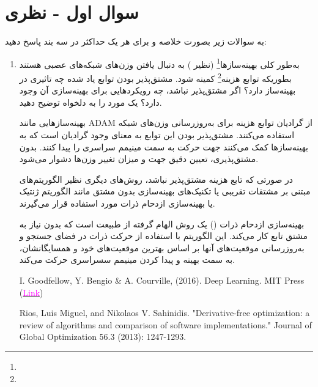 \section{سوال اول - نظری}
به سوالات زیر بصورت خلاصه و برای هر یک حداکثر در سه بند پاسخ دهید:

\begin{enumerate}
	\item 
به‌طور کلی بهینه‌سازها\footnote{} (نظیر ) به دنبال یافتن وزن‌های شبکه‌های عصبی هستند بطوریکه توابع هزینه\footnote{} کمینه شود. مشتق‌پذیر بودن توابع یاد شده چه تاثیری در بهینه‌ساز دارد؟ اگر مشتق‌پذیر نباشد، چه رویکردهایی برای بهینه‌سازی آن وجود دارد؟ یک مورد را به دلخواه توضیح دهید.
\begin{qsolve}
بهینه‌سازهایی مانند ADAM از گرادیان‌ توابع هزینه برای به‌روزرسانی وزن‌های شبکه استفاده می‌کنند. مشتق‌پذیر بودن این توابع به معنای وجود گرادیان‌ است که به بهینه‌سازها کمک می‌کنند جهت حرکت به سمت مینیمم سراسری را پیدا کنند. بدون مشتق‌پذیری، تعیین دقیق جهت و میزان تغییر وزن‌ها دشوار می‌شود.
		
در صورتی که تابع هزینه مشتق‌پذیر نباشد، روش‌های دیگری نظیر الگوریتم‌های مبتنی بر مشتقات تقریبی یا تکنیک‌های بهینه‌سازی بدون مشتق مانند الگوریتم‌ ژنتیک یا بهینه‌سازی ازدحام ذرات
مورد استفاده قرار می‌گیرند.

 بهینه‌سازی ازدحام ذرات () یک روش الهام گرفته از طبیعت است که بدون نیاز به مشتق تابع کار می‌کند. این الگوریتم با استفاده از حرکت ذرات در فضای جستجو و به‌روزرسانی موقعیت‌های آنها بر اساس بهترین موقعیت‌های خود و همسایگانشان، به سمت بهینه و پیدا کردن مینیمم سسراسری حرکت می‌کند.
 
 \begin{latin}
 	\begin{thebibliography}{9}
 		I. Goodfellow, Y. Bengio \& A. Courville, (2016). Deep Learning. MIT Press (\href{https://www.deeplearningbook.org/}{\textcolor{magenta}{Link}})
 		
 		Rios, Luis Miguel, and Nikolaos V. Sahinidis. "Derivative-free optimization: a review of algorithms and comparison of software implementations." Journal of Global Optimization 56.3 (2013): 1247-1293.
 		
 	\end{thebibliography} 
 \end{latin}
\end{qsolve}
	
	
	
	
	

\end{enumerate}
